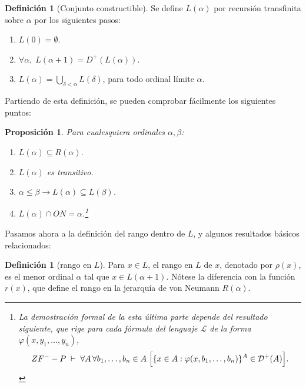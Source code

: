 \documentclass[11pt,a4paper]{book}
\theoremstyle{plain}
\newtheorem{proposicion}[teorema]{Proposición}
\theoremstyle{definition}
\newtheorem{definicion}[teorema]{Definición}
\theoremstyle{remark}
\begin{document}
\begin{definicion}[Conjunto constructible]
  \label{definicion-L}
  Se define $L(\alpha)$ por recursión transfinita sobre $\alpha$ por los siguientes pasos:
  
  \begin{enumerate}

    \item $L(0) = \emptyset$.
    
    \item $\forall \alpha, \; L(\alpha + 1) = D^+(L(\alpha))$.
  
    \item $ L(\alpha) = \bigcup_{\delta < \alpha} L(\delta)$, para todo ordinal límite $\alpha$.

  \end{enumerate}
\end{definicion}

Partiendo de esta definición, se pueden comprobar fácilmente los siguientes puntos:

\begin{proposicion}
  \label{proposicion-L}
Para cualesquiera ordinales $\alpha, \beta$:

\begin{enumerate}
  \item $L(\alpha) \subseteq R(\alpha)$.
  \item $L(\alpha)$ es transitivo.
  \item $\alpha \leq \beta \longrightarrow L(\alpha) \subseteq L(\beta)$.
  \item $L(\alpha) \cap ON = \alpha$.\footnote{La demostración formal de la esta última parte depende del resultado siguiente, que rige para cada fórmula del lenguaje $\mathcal{L}$ de la forma $\varphi(x, y_1, \dots, y_n)$,
\[
ZF^- - P \;\vdash\; \forall A \, \forall b_1, \dots, b_n \in A \;
\Bigl[ \{x \in A : \varphi(x, b_1, \dots, b_n)\}^A \in \mathcal{D}^+(A) \Bigr].
\]}
\end{enumerate}
\end{proposicion}

Pasamos ahora a la definición del rango dentro de $L$, y algunos resultados básicos relacionados:

\begin{definicion} [rango en $L$]
Para $x \in L$, el rango en $L$ de $x$, denotado por $\rho(x)$, es el menor ordinal $\alpha$ tal que 
$x \in L(\alpha + 1)$. Nótese la diferencia con la función $r(x)$, que define el rango en la jerarquía de von Neumann $R(\alpha)$.
\end{definicion}
\end{document}
